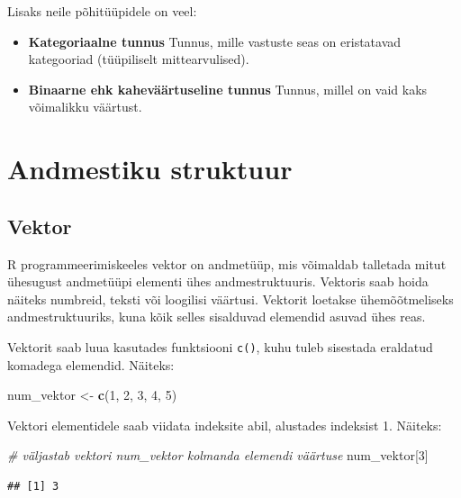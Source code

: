 \documentclass[
]{book}
\newenvironment{Shaded}{\begin{snugshade}}{\end{snugshade}}
\newcommand{\CommentTok}[1]{\textcolor[rgb]{0.56,0.35,0.01}{\textit{#1}}}
\newcommand{\DecValTok}[1]{\textcolor[rgb]{0.00,0.00,0.81}{#1}}
\newcommand{\FunctionTok}[1]{\textcolor[rgb]{0.13,0.29,0.53}{\textbf{#1}}}
\newcommand{\NormalTok}[1]{#1}
\newcommand{\OtherTok}[1]{\textcolor[rgb]{0.56,0.35,0.01}{#1}}
\providecommand{\tightlist}{%
  \setlength{\itemsep}{0pt}\setlength{\parskip}{0pt}}
\renewenvironment{Shaded} {\begin{snugshade}\footnotesize} {\end{snugshade}}
\begin{document}
Lisaks neile põhitüüpidele on veel:

\begin{itemize}
\tightlist
\item
  \textbf{Kategoriaalne tunnus} Tunnus, mille vastuste seas on eristatavad kategooriad (tüüpiliselt mittearvulised).
\item
  \textbf{Binaarne ehk kaheväärtuseline tunnus} Tunnus, millel on vaid kaks võimalikku väärtust.
\end{itemize}

\section{Andmestiku struktuur}\label{andmestiku-struktuur}

\subsection{Vektor}\label{vektor}

R programmeerimiskeeles vektor on andmetüüp, mis võimaldab talletada mitut ühesugust andmetüüpi elementi ühes andmestruktuuris. Vektoris saab hoida näiteks numbreid, teksti või loogilisi väärtusi. Vektorit loetakse ühemõõtmeliseks andmestruktuuriks, kuna kõik selles sisalduvad elemendid asuvad ühes reas.

Vektorit saab luua kasutades funktsiooni \texttt{c()}, kuhu tuleb sisestada eraldatud komadega elemendid. Näiteks:

\begin{Shaded}
\begin{Highlighting}[]
\NormalTok{num\_vektor }\OtherTok{\textless{}{-}} \FunctionTok{c}\NormalTok{(}\DecValTok{1}\NormalTok{, }\DecValTok{2}\NormalTok{, }\DecValTok{3}\NormalTok{, }\DecValTok{4}\NormalTok{, }\DecValTok{5}\NormalTok{)}
\end{Highlighting}
\end{Shaded}

Vektori elementidele saab viidata indeksite abil, alustades indeksist 1. Näiteks:

\begin{Shaded}
\begin{Highlighting}[]
\CommentTok{\# väljastab vektori num\_vektor kolmanda elemendi väärtuse}
\NormalTok{num\_vektor[}\DecValTok{3}\NormalTok{] }
\end{Highlighting}
\end{Shaded}

\begin{verbatim}
## [1] 3
\end{verbatim}
\end{document}
